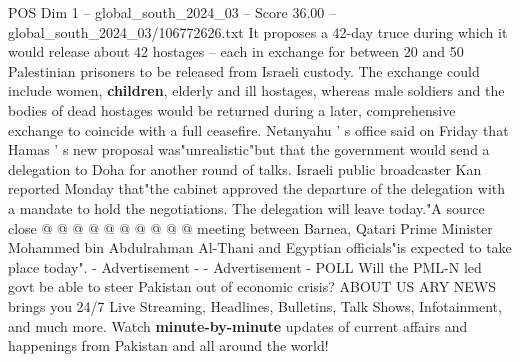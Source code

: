 \begin{textsample}{POS Dim 1 – global\_south\_2024\_03 – Score 36.00 – global\_south\_2024\_03/106772626.txt}
It proposes a 42-day truce during which it would release about 42 hostages -- each in exchange for between 20 and 50 Palestinian prisoners to be released from Israeli custody.
The exchange could include women, \textbf{children}, elderly and ill hostages, whereas male soldiers and the bodies of dead hostages would be returned during a later, comprehensive exchange to coincide with a full ceasefire.
Netanyahu ' s office said on Friday that Hamas ' s new proposal was"unrealistic"but that the government would send a delegation to Doha for another round of talks.
Israeli public broadcaster Kan reported Monday that"the cabinet approved the departure of the delegation with a mandate to hold the negotiations.
The delegation will leave today."A source close @ @ @ @ @ @ @ @ @ @ meeting between Barnea, Qatari Prime Minister Mohammed bin Abdulrahman Al-Thani and Egyptian officials"is expected to take place today". - Advertisement - - Advertisement - POLL Will the PML-N led govt be able to steer Pakistan out of economic crisis?
ABOUT US ARY NEWS brings you 24/7 Live Streaming, Headlines, Bulletins, Talk Shows, Infotainment, and much more.
Watch \textbf{minute-by-minute} updates of current affairs and happenings from Pakistan and all around the world!

\end{textsample}
